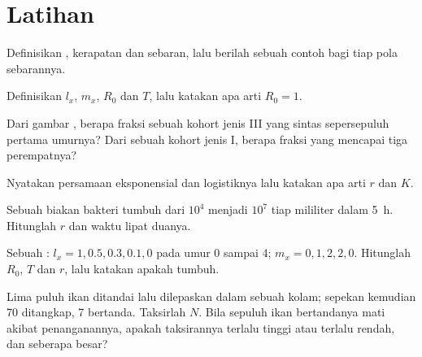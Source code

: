 \section{Latihan}

\begin{exercise}[$\star$]\label{exo:b1:populations:1}
Definisikan , kerapatan dan sebaran, lalu berilah sebuah
contoh bagi tiap pola sebarannya.
\end{exercise}

\begin{exercise}[$\star$]\label{exo:b1:populations:2}
Definisikan $l_x$, $m_x$, $R_0$ dan $T$, lalu katakan apa arti $R_0 = 1$.
\end{exercise}

\begin{exercise}[$\star$]\label{exo:b1:populations:3}
Dari gambar , berapa fraksi sebuah kohort jenis III yang
sintas sepersepuluh pertama umurnya? Dari sebuah kohort jenis I,
berapa fraksi yang mencapai tiga perempatnya?
\end{exercise}

\begin{exercise}[$\star$]\label{exo:b1:populations:4}
Nyatakan persamaan eksponensial dan logistiknya lalu katakan apa arti
$r$ dan $K$.
\end{exercise}

\begin{exercise}[$\star\star$]\label{exo:b1:populations:5}
Sebuah biakan bakteri tumbuh dari $10^4$ menjadi $10^7$  tiap
mililiter dalam \qty{5}{h}. Hitunglah $r$ dan waktu lipat duanya.
\end{exercise}

\begin{exercise}[$\star\star$]\label{exo:b1:populations:6}
Sebuah : $l_x = 1, 0.5, 0.3, 0.1, 0$ pada umur 0 sampai 4; $m_x = 0,
1, 2, 2, 0$. Hitunglah $R_0$, $T$ dan $r$, lalu katakan apakah
 tumbuh.
\end{exercise}

\begin{exercise}[$\star\star$]\label{exo:b1:populations:7}
Lima puluh ikan ditandai lalu dilepaskan dalam sebuah kolam; sepekan
kemudian 70 ditangkap, 7 bertanda. Taksirlah $N$. Bila sepuluh ikan
bertandanya mati akibat penanganannya, apakah taksirannya terlalu
tinggi atau terlalu rendah, dan seberapa besar?
\end{exercise}

